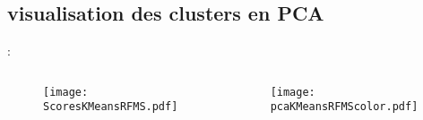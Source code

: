 \documentclass[8pt,aspectratio=169,hyperref={unicode=true}]{beamer}
\begin{document}
\subsection{visualisation des clusters en PCA}
\begin{frame}{\insertsection: \insertsubsection}
    \begin{columns}
        \begin{column}{.4\textwidth}
            \begin{figure}
                \texttt{[image: ScoresKMeansRFMS.pdf]}
            \end{figure}
        \end{column}
        \begin{column}{.6\textwidth}
            \texttt{[image: pcaKMeansRFMScolor.pdf]}
        \end{column}
    \end{columns}
\end{frame}
\end{document}
